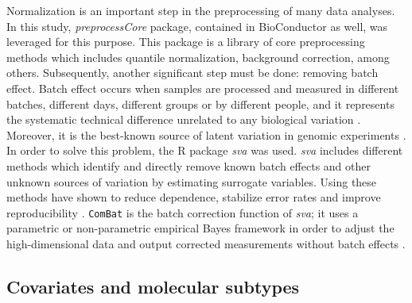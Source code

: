 Normalization is an important step in the preprocessing of many data analyses. In this study, \textit{preprocessCore} \cite{preprocessCore} package, contained in BioConductor as well, was leveraged for this purpose. This package is a library of core preprocessing methods which includes quantile normalization, background correction, among others. Subsequently, another significant step must be done: removing batch effect. Batch effect occurs when samples are processed and measured in different batches, different days, different groups or by different people, and it represents the systematic technical difference unrelated to any biological variation \cite{sva}. Moreover, it is the best-known source of latent variation in genomic experiments \cite{leek}. In order to solve this problem, the R package \textit{sva} \cite{sva} was used. \textit{sva} includes different methods which identify and directly remove known batch effects and other unknown sources of variation by estimating surrogate variables. Using these methods have shown to reduce dependence, stabilize error rates and improve reproducibility \cite{leek}. \verb|ComBat| is the batch correction function of \textit{sva}; it uses a parametric or non-parametric empirical Bayes framework in order to adjust the high-dimensional data and output corrected measurements without batch effects \cite{sva}.

\subsection{Covariates and molecular subtypes}


